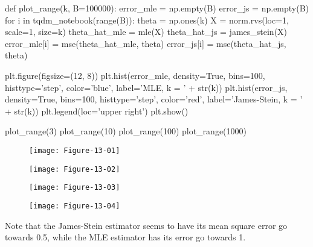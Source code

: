 \begin{python}
def plot_range(k, B=100000):
    error_mle = np.empty(B)
    error_{j}s = np.empty(B)
    for i in tqdm_{n}otebook(range(B)):
        theta = np.ones(k)
        X = norm.rvs(loc=1, scale=1, size=k)
        theta_hat_mle = mle(X)
        theta_hat_{j}s = james_stein(X)
        error_mle[i] = mse(theta_hat_mle, theta)
        error_{j}s[i] = mse(theta_hat_{j}s, theta)

    plt.figure(figsize=(12, 8))
    plt.hist(error_mle, density=True, bins=100, histtype='step', color='blue', label='MLE, k = ' + str(k))
    plt.hist(error_{j}s, density=True, bins=100, histtype='step', color='red', label='James-Stein, k = ' + str(k))
    plt.legend(loc='upper right')
    plt.show()
\end{python}

\begin{python}
plot_range(3)
plot_range(10)
plot_range(100)
plot_range(1000)
\end{python}

\begin{figure}[H]
\centering
\texttt{[image: Figure-13-01]}
\end{figure}

\begin{figure}[H]
\centering
\texttt{[image: Figure-13-02]}
\end{figure}

\begin{figure}[H]
\centering
\texttt{[image: Figure-13-03]}
\end{figure}

\begin{figure}[H]
\centering
\texttt{[image: Figure-13-04]}
\end{figure}

Note that the James-Stein estimator seems to have its mean square error
go towards 0.5, while the MLE estimator has its error go towards 1.

